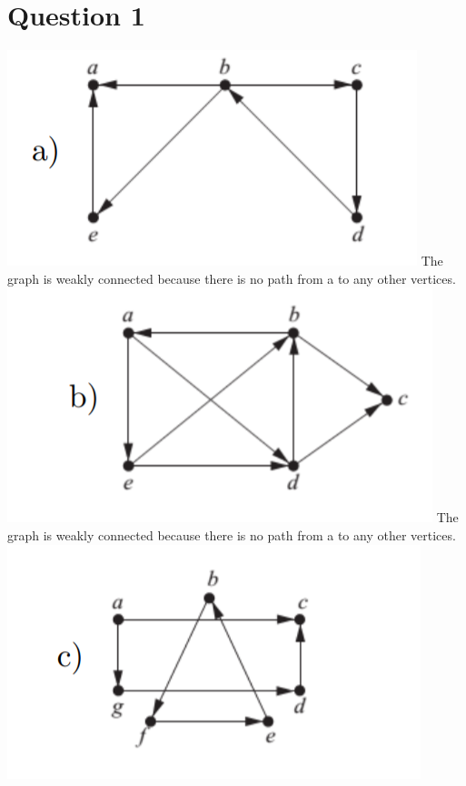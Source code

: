 \documentclass{article}
\begin{document}
\section*{Question 1}
\includegraphics[]{Question 1/connectivity_1.a.png}
\newline
The graph is weakly connected because there is no path from a to any other vertices.
\newline
\includegraphics[]{Question 1/connectivity_1.b.png}
\newline
The graph is weakly connected because there is no path from a to any other vertices.
\newline
\includegraphics[]{Question 1/connectivity_1.c.png}
\end{document}
